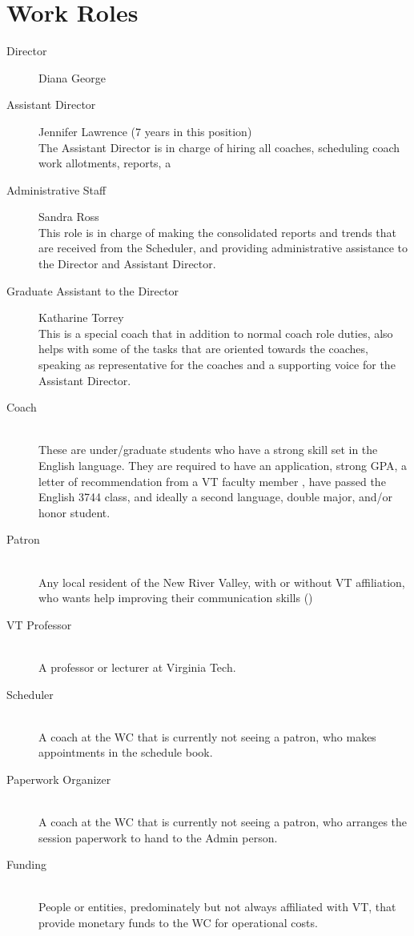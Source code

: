 \documentclass[12pt]{article} %
\begin{document}
\section{Work Roles} %
  \begin{description} %
  \item[Director]
  Diana George
  \item[Assistant Director]
  Jennifer Lawrence (7 years in this position)\\
  The Assistant Director is in charge of hiring all coaches, scheduling coach work allotments, reports, a
  \item[Administrative Staff]
  Sandra Ross \\
  This role is in charge of making the consolidated reports and trends that are received from the Scheduler, and providing administrative assistance to the Director and Assistant Director. 
  \item[Graduate Assistant to the Director]
  Katharine Torrey \\
  This is a special coach that in addition to normal coach role duties, also helps with some of the tasks that are oriented towards the coaches, speaking as representative for the coaches and a supporting voice for the Assistant Director.
  \item[Coach] \hfill \\
  These are under/graduate students who have a strong skill set in the English language.
  They are required to have an application, strong GPA, a letter of recommendation from a VT faculty member , have passed the English 3744 class, and ideally a second language, double major, and/or honor student.
  \item[Patron] \hfill \\
  Any local resident of the New River Valley, with or without VT affiliation, who wants help improving their communication skills ()
  \item[VT Professor] \hfill \\
  A professor or lecturer at Virginia Tech.
  \item[Scheduler] \hfill \\
  A coach at the WC that is currently not seeing a patron, who makes appointments in the schedule book.
  \item[Paperwork Organizer] \hfill \\
  A coach at the WC that is currently not seeing a patron, who arranges the session paperwork to hand to the Admin person.
  \item[Funding] \hfill \\
  People or entities, predominately but not always affiliated with VT, that provide monetary funds to the WC for operational costs.
  \end{description} 
\end{document}
